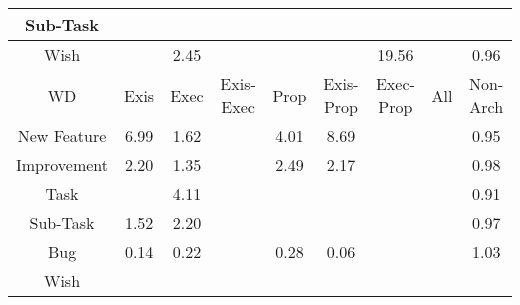 \begin{tabular}{|c||c|c|c|c|c|c|c|c|}
\hline
Sub-Task &  &  &  &  &  &  &  &  \\ 
\hline
Wish &  & \cellcolor[rgb]{0.8803470605043542,0.8259538707652204,0.42} 2.45 &  &  &  & \cellcolor[rgb]{0.53,0.66,0.42} 19.56 &  & \cellcolor[rgb]{0.903900390282112,0.8111285140019963,0.41430703092997107} 0.96 \\ 
\hline
\hline
WD & Exis & Exec & Exis-Exec & Prop & Exis-Prop & Exec-Prop & All & Non-Arch \\ 
\hline
New Feature & \cellcolor[rgb]{0.7874633231780143,0.7819563109790594,0.42} 6.99 & \cellcolor[rgb]{0.8972209787173341,0.8339467793924213,0.42} 1.62 &  & \cellcolor[rgb]{0.8483677658550725,0.8108057838260869,0.42} 4.01 & \cellcolor[rgb]{0.7525167602679197,0.765402675916383,0.42} 8.69 &  &  & \cellcolor[rgb]{0.9022973790166045,0.8035409273452612,0.4128108870821642} 0.95 \\ 
\hline
Improvement & \cellcolor[rgb]{0.885413199263036,0.8283536207035433,0.42} 2.20 & \cellcolor[rgb]{0.9028808689900316,0.8366277800479096,0.42} 1.35 &  & \cellcolor[rgb]{0.8795893388345521,0.8255949499742615,0.42} 2.49 & \cellcolor[rgb]{0.8860030709320527,0.8286330335993933,0.42} 2.17 &  &  & \cellcolor[rgb]{0.9072493868975898,0.8269804313152579,0.417432761104417} 0.98 \\ 
\hline
Task &  & \cellcolor[rgb]{0.8463055936753465,0.8098289654251641,0.42} 4.11 &  &  &  &  &  & \cellcolor[rgb]{0.8966036127467581,0.7765904336679881,0.4074967052303075} 0.91 \\ 
\hline
Sub-Task & \cellcolor[rgb]{0.8993425740206364,0.8349517455887225,0.42} 1.52 & \cellcolor[rgb]{0.8853317176391773,0.8283150241448733,0.41999999999999993} 2.20 &  &  &  &  &  & \cellcolor[rgb]{0.9046352378296978,0.8146067923939024,0.41499288864105116} 0.97 \\ 
\hline
Bug & \cellcolor[rgb]{0.7774337145034877,0.2125195819831756,0.296271466869922} 0.14 & \cellcolor[rgb]{0.7905161029285117,0.2744428871949549,0.30848169606661086} 0.22 &  & \cellcolor[rgb]{0.7995697840332825,0.3172969777575372,0.31693179843106367} 0.28 & \cellcolor[rgb]{0.7651995615112122,0.1546112578197375,0.28485292407713136} 0.06 &  &  & \cellcolor[rgb]{0.9094518759781989,0.8397403623054627,0.42} 1.03 \\ 
\hline
Wish &  &  &  &  &  &  &  &  \\ 
\hline
\end{tabular}